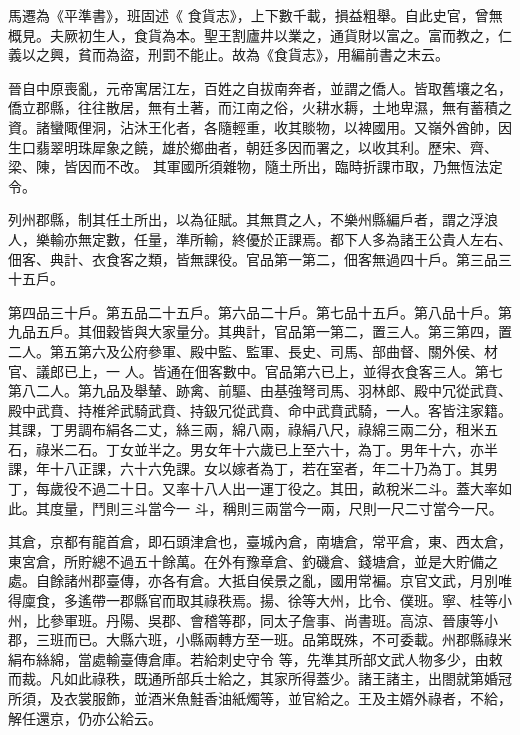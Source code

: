 \begin{pinyinscope}
 馬遷為《平準書》，班固述《
 食貨志》，上下數千載，損益粗舉。自此史官，曾無概見。夫厥初生人，食貨為本。聖王割廬井以業之，通貨財以富之。富而教之，仁義以之興，貧而為盜，刑罰不能止。故為《食貨志》，用編前書之末云。



 晉自中原喪亂，元帝寓居江左，百姓之自拔南奔者，並謂之僑人。皆取舊壤之名，僑立郡縣，往往散居，無有土著，而江南之俗，火耕水耨，土地卑濕，無有蓄積之資。諸蠻陬俚洞，沾沐王化者，各隨輕重，收其賧物，以裨國用。又嶺外酋帥，因生口翡翠明珠犀象之饒，雄於鄉曲者，朝廷多因而署之，以收其利。歷宋、齊、梁、陳，皆因而不改。
 其軍國所須雜物，隨土所出，臨時折課市取，乃無恆法定令。



 列州郡縣，制其任土所出，以為征賦。其無貫之人，不樂州縣編戶者，謂之浮浪人，樂輸亦無定數，任量，準所輸，終優於正課焉。都下人多為諸王公貴人左右、佃客、典計、衣食客之類，皆無課役。官品第一第二，佃客無過四十戶。第三品三十五戶。



 第四品三十戶。第五品二十五戶。第六品二十戶。第七品十五戶。第八品十戶。第九品五戶。其佃穀皆與大家量分。其典計，官品第一第二，置三人。第三第四，置二人。第五第六及公府參軍、殿中監、監軍、長史、司馬、部曲督、關外侯、材官、議郎已上，一
 人。皆通在佃客數中。官品第六已上，並得衣食客三人。第七第八二人。第九品及舉輦、跡禽、前驅、由基強弩司馬、羽林郎、殿中冗從武賁、殿中武賁、持椎斧武騎武賁、持鈒冗從武賁、命中武賁武騎，一人。客皆注家籍。其課，丁男調布絹各二丈，絲三兩，綿八兩，祿絹八尺，祿綿三兩二分，租米五石，祿米二石。丁女並半之。男女年十六歲已上至六十，為丁。男年十六，亦半課，年十八正課，六十六免課。女以嫁者為丁，若在室者，年二十乃為丁。其男丁，每歲役不過二十日。又率十八人出一運丁役之。其田，畝稅米二斗。蓋大率如此。其度量，鬥則三斗當今一
 斗，稱則三兩當今一兩，尺則一尺二寸當今一尺。



 其倉，京都有龍首倉，即石頭津倉也，臺城內倉，南塘倉，常平倉，東、西太倉，東宮倉，所貯總不過五十餘萬。在外有豫章倉、釣磯倉、錢塘倉，並是大貯備之處。自餘諸州郡臺傳，亦各有倉。大抵自侯景之亂，國用常褊。京官文武，月別唯得廩食，多遙帶一郡縣官而取其祿秩焉。揚、徐等大州，比令、僕班。寧、桂等小州，比參軍班。丹陽、吳郡、會稽等郡，同太子詹事、尚書班。高涼、晉康等小郡，三班而已。大縣六班，小縣兩轉方至一班。品第既殊，不可委載。州郡縣祿米絹布絲綿，當處輸臺傳倉庫。若給刺史守令
 等，先準其所部文武人物多少，由敕而裁。凡如此祿秩，既通所部兵士給之，其家所得蓋少。諸王諸主，出閤就第婚冠所須，及衣裳服飾，並酒米魚鮭香油紙燭等，並官給之。王及主婿外祿者，不給，解任還京，仍亦公給云。




\end{pinyinscope}
